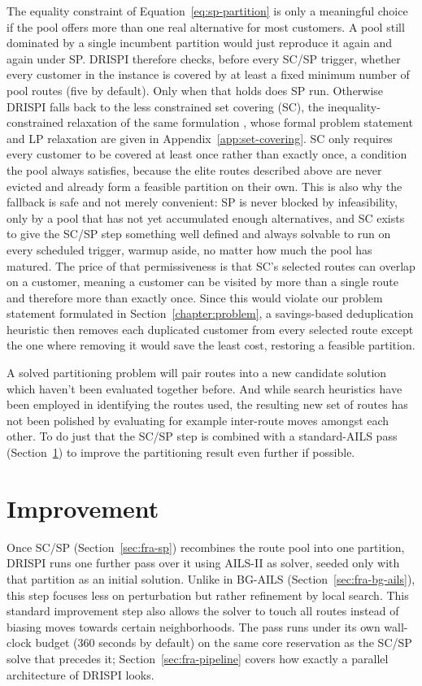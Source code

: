 The equality constraint of Equation~\ref{eq:sp-partition} is only a meaningful choice if the pool offers more than one real alternative for most customers. A pool still dominated by a single incumbent partition would just reproduce it again and again under SP. DRISPI therefore checks, before every SC/SP trigger, whether every customer in the instance is covered by at least a fixed minimum number of pool routes (five by default). Only when that holds does SP run. Otherwise DRISPI falls back to the less constrained set covering (SC), the inequality-constrained relaxation of the same formulation \citep{garfinkelSetPartitioningProblemSetCovering1969}, whose formal problem statement and LP relaxation are given in Appendix~\ref{app:set-covering}. SC only requires every customer to be covered at least once rather than exactly once, a condition the pool always satisfies, because the elite routes described above are never evicted and already form a feasible partition on their own. This is also why the fallback is safe and not merely convenient: SP is never blocked by infeasibility, only by a pool that has not yet accumulated enough alternatives, and SC exists to give the SC/SP step something well defined and always solvable to run on every scheduled trigger, warmup aside, no matter how much the pool has matured. The price of that permissiveness is that SC's selected routes can overlap on a customer, meaning a customer can be visited by more than a single route and therefore more than exactly once. Since this would violate our problem statement formulated in Section~\ref{chapter:problem}, a savings-based deduplication heuristic then removes each duplicated customer from every selected route except the one where removing it would save the least cost, restoring a feasible partition.

A solved partitioning problem will pair routes into a new candidate solution which haven't been evaluated together before. And while search heuristics have been employed in identifying the routes used, the resulting new set of routes has not been polished by evaluating for example inter-route moves amongst each other. To do just that the SC/SP step is combined with a standard-AILS pass (Section~\ref{sec:fra-improve}) to improve the partitioning result even further if possible.

\section{Improvement}\label{sec:fra-improve}
Once SC/SP (Section~\ref{sec:fra-sp}) recombines the route pool into one partition, DRISPI runs one further pass over it using AILS-II as solver, seeded only with that partition as an initial solution. Unlike in BG-AILS (Section~\ref{sec:fra-bg-ails}), this step focuses less on perturbation but rather refinement by local search. This standard improvement step also allows the solver to touch all routes instead of biasing moves towards certain neighborhoods. The pass runs under its own wall-clock budget (360 seconds by default) on the same core reservation as the SC/SP solve that precedes it; Section~\ref{sec:fra-pipeline} covers how exactly a parallel architecture of DRISPI looks.

